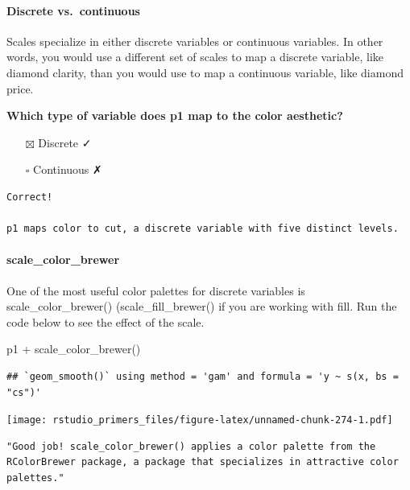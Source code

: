 \documentclass[
]{article}
\newenvironment{Shaded}{\begin{snugshade}}{\end{snugshade}}
\newcommand{\FunctionTok}[1]{\textcolor[rgb]{0.00,0.00,0.00}{#1}}
\newcommand{\NormalTok}[1]{#1}
\newcommand{\SpecialCharTok}[1]{\textcolor[rgb]{0.00,0.00,0.00}{#1}}
\providecommand{\tightlist}{%
  \setlength{\itemsep}{0pt}\setlength{\parskip}{0pt}}
\begin{document}
\hypertarget{discrete-vs.-continuous}{%
\paragraph{Discrete vs.~continuous}\label{discrete-vs.-continuous}}

Scales specialize in either discrete variables or continuous variables.
In other words, you would use a different set of scales to map a
discrete variable, like diamond clarity, than you would use to map a
continuous variable, like diamond price.

\textbf{Which type of variable does p1 map to the color aesthetic?}

\begin{itemize}
\tightlist
\item[$\boxtimes$]
  Discrete ✓
\item[$\square$]
  Continuous ✗
\end{itemize}

\begin{verbatim}
Correct!

p1 maps color to cut, a discrete variable with five distinct levels.
\end{verbatim}

\hypertarget{scale_color_brewer}{%
\paragraph{scale\_color\_brewer}\label{scale_color_brewer}}

One of the most useful color palettes for discrete variables is
scale\_color\_brewer() (scale\_fill\_brewer() if you are working with
fill. Run the code below to see the effect of the scale.

\begin{Shaded}
\begin{Highlighting}[]
\NormalTok{p1 }\SpecialCharTok{+} \FunctionTok{scale\_color\_brewer}\NormalTok{()}
\end{Highlighting}
\end{Shaded}

\begin{verbatim}
## `geom_smooth()` using method = 'gam' and formula = 'y ~ s(x, bs = "cs")'
\end{verbatim}

\texttt{[image: rstudio\_primers\_files/figure-latex/unnamed-chunk-274-1.pdf]}

\begin{verbatim}
"Good job! scale_color_brewer() applies a color palette from the RColorBrewer package, a package that specializes in attractive color palettes."
\end{verbatim}
\end{document}
